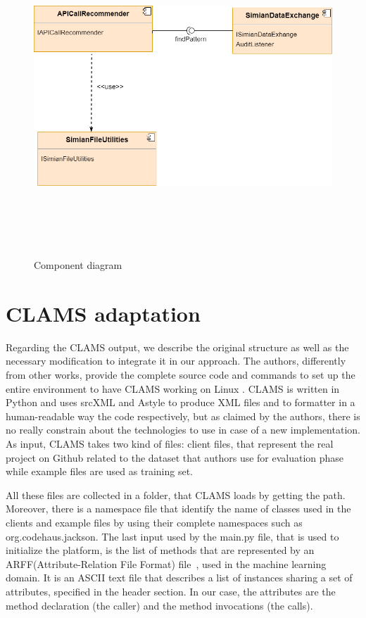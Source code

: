 \begin{figure}[!h]
\includegraphics[width=12cm,height=12cm,keepaspectratio]{images/Component.png}
\centering
\caption{Component diagram}
\label{fig:cmd}
\end{figure}

\section{CLAMS adaptation}
Regarding the CLAMS output, we describe the original structure as well as the necessary modification to integrate it in our approach. The authors, differently from other works, provide the complete source code and commands to set up the entire environment to have CLAMS working on Linux . CLAMS is written in Python and uses srcXML and Astyle to produce XML files and to formatter in a human-readable way the code respectively, but as claimed by the authors, there is no really constrain about the technologies to use in case of a new implementation. As input, CLAMS takes two kind of files: client files, that represent the real project on Github related to the dataset that authors use for evaluation phase while example files are used as training set.
 
All these files are collected in a folder, that CLAMS loads by getting the path. Moreover, there is a namespace file that identify the name of classes used in the clients and example files by using their complete namespaces such as org.codehaus.jackson. The last input used by the main.py file, that is used to initialize the platform, is the list of methods that are represented by an ARFF(Attribute-Relation File Format) file~\cite{https://www.cs.waikato.ac.nz_last_nodate}, used in the machine learning domain. It is an ASCII text file that describes a list of instances sharing a set of attributes, specified in the header section. In our case, the attributes are the method declaration (the caller) and the method invocations (the calls). 

